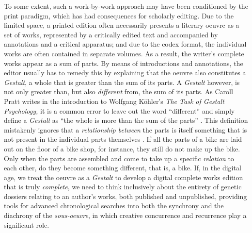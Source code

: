 \begin{paper}
To some extent, such a work-by-work approach may have been conditioned
by the print paradigm, which has had consequences for scholarly editing.
Due to the limited space, a printed edition often necessarily presents a
literary oeuvre as a set of works, represented by a critically edited
text and accompanied by annotations and a critical apparatus; and due to
the codex format, the individual works are often contained in separate
volumes. As a result, the writer's complete works appear as a sum of
parts. By means of introductions and annotations, the editor usually has
to remedy this by explaining that the oeuvre also constitutes a
\emph{Gestalt}, a whole that is greater than the sum of its parts. A
\emph{Gestalt} however, is not only greater than, but also
\emph{different} from, the sum of its parts. As Caroll Pratt writes in
the introduction to Wolfgang Köhler's \emph{The Task of Gestalt
Psychology,} it is a common error to leave out the word ``different''
and simply define a \emph{Gestalt} as ``the whole is more than the sum
of the parts'' \citep[9]{pratt_introduction_1969}. This definition mistakenly ignores that a
\emph{relationship between} the parts is itself something that is not
present in the individual parts themselves \citep[10]{pratt_introduction_1969}. If all the parts
of a bike are laid out on the floor of a bike shop, for instance, they
still do not make up the bike. Only when the parts are assembled and
come to take up a specific \emph{relation} to each other, do they become
something different, that is, a bike. If, in the digital age, we treat
the oeuvre as a \emph{Gestalt} to develop a digital complete works
edition that is truly \emph{complete}, we need to think inclusively
about the entirety of genetic dossiers relating to an author's works,
both published and unpublished, providing tools for advanced
chronological searches into both the synchrony and the diachrony of the
\emph{sous-oeuvre}, in which creative concurrence and recurrence play a
significant role.

\begin{flushleft}
  
\end{flushleft}

\end{paper}